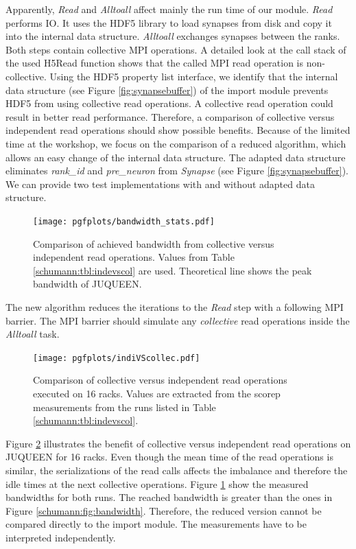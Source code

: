 Apparently, \emph{Read} and \emph{Alltoall} affect mainly the run time of our module.
\emph{Read} performs IO. It uses the HDF5 library to load synapses from disk and copy it into the internal data structure.
\emph{Alltoall} exchanges synapses between the ranks. Both steps contain collective MPI operations.
A detailed look at the call stack of the used H5Read function shows that the called MPI read operation is non-collective.
Using the HDF5 property list interface, we identify that the internal data structure (see Figure \ref{fig:synapsebuffer}) of the import module prevents HDF5 from using collective read operations.
A collective read operation could result in better read performance.
Therefore, a comparison of collective versus independent read operations should show possible benefits.
Because of the limited time at the workshop, we focus on the comparison of a reduced algorithm,
which allows an easy change of the internal data structure.
The adapted data structure eliminates \emph{rank\_id} and \emph{pre\_neuron} from \emph{Synapse} (see Figure \ref{fig:synapsebuffer}).
We can provide two test implementations with and without adapted data structure.
\begin{figure}[h!]
\begin{center}
 \texttt{[image: pgfplots/bandwidth\_stats.pdf]}
\end{center}
\caption[Comparison of achieved bandwidth from collective versus independent read operations]{Comparison of achieved bandwidth from collective versus independent read operations.
 Values from Table \ref{schumann:tbl:indevscol} are used. Theoretical line shows the peak bandwidth of
 JUQUEEN.}
 \label{fig:indiVScollecBand}
\end{figure}
The new algorithm reduces the iterations to the \emph{Read} step with a following MPI barrier.
The MPI barrier should simulate any \emph{collective} read operations inside the \emph{Alltoall} task.
\begin{figure}[h!]
\begin{center}
 \texttt{[image: pgfplots/indiVScollec.pdf]}
\end{center}
\caption{Comparison of collective versus independent read operations executed on 16 racks.
 Values are extracted from the scorep measurements from the runs listed in Table \ref{schumann:tbl:indevscol}.}
 \label{schumann:fig:indiVScollec}
\end{figure}

\newpage
Figure \ref{schumann:fig:indiVScollec} illustrates the benefit of collective versus independent read operations
on JUQUEEN for 16 racks.
Even though the mean time of the read operations is similar, the serializations of the read calls affects the
imbalance and therefore the idle times at the next collective operations.
Figure \ref{fig:indiVScollecBand} show the measured bandwidths for both runs.
The reached bandwidth is greater than the ones in Figure \ref{schumann:fig:bandwidth}.
Therefore, the reduced version cannot be compared directly to the import module.
The measurements have to be interpreted independently.

